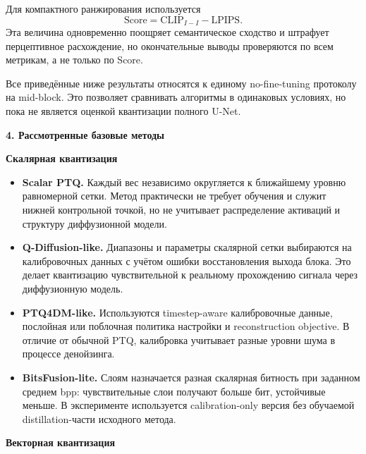\documentclass[11pt,a4paper]{article}
\newcommand{\sectiontitle}[1]{%
  \vspace{0.18cm}
  {\large\bfseries\color{msublue} #1}\par\vspace{0.08cm}
}
\newcommand{\subsectiontitle}[1]{%
  \vspace{0.10cm}
  {\normalsize\bfseries\color{msured} #1}\par\vspace{0.04cm}
}
\newcommand{\note}[1]{%
  \begingroup
  \setlength{\fboxsep}{6pt}
  \noindent\colorbox{softblue}{\parbox{\dimexpr\textwidth-2\fboxsep\relax}{#1}}
  \endgroup
}
\begin{document}
Для компактного ранжирования используется
\[
  \mathrm{Score}=\mathrm{CLIP}_{I-I}-\mathrm{LPIPS}.
\]
Эта величина одновременно поощряет семантическое сходство и штрафует перцептивное расхождение, но окончательные выводы проверяются по всем метрикам, а не только по Score.

\note{Все приведённые ниже результаты относятся к единому no-fine-tuning протоколу на mid-block. Это позволяет сравнивать алгоритмы в одинаковых условиях, но пока не является оценкой квантизации полного U-Net.}

\newpage

\sectiontitle{4. Рассмотренные базовые методы}

\subsectiontitle{Скалярная квантизация}

\begin{itemize}\setlength\itemsep{0.28cm}\setlength\topsep{0.06cm}
  \item \textbf{Scalar PTQ.} Каждый вес независимо округляется к ближайшему уровню равномерной сетки. Метод практически не требует обучения и служит нижней контрольной точкой, но не учитывает распределение активаций и структуру диффузионной модели.

  \item \textbf{Q-Diffusion-like.} Диапазоны и параметры скалярной сетки выбираются на калибровочных данных с учётом ошибки восстановления выхода блока. Это делает квантизацию чувствительной к реальному прохождению сигнала через диффузионную модель.

  \item \textbf{PTQ4DM-like.} Используются timestep-aware калибровочные данные, послойная или поблочная политика настройки и reconstruction objective. В отличие от обычной PTQ, калибровка учитывает разные уровни шума в процессе денойзинга.

  \item \textbf{BitsFusion-lite.} Слоям назначается разная скалярная битность при заданном среднем bpp: чувствительные слои получают больше бит, устойчивые \textemdash{} меньше. В эксперименте используется calibration-only версия без обучаемой distillation-части исходного метода.
\end{itemize}

\subsectiontitle{Векторная квантизация}
\end{document}

